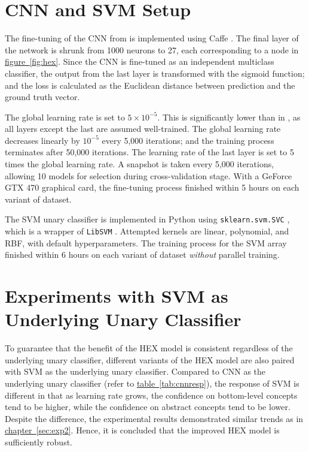\documentclass[11pt,a4paper]{book}
\begin{document}
\section{CNN and SVM Setup}
\label{sec:setup}

The fine-tuning of the CNN from \cite{krizhevsky2012imagenet} is implemented using Caffe \cite{jia2014caffe}. The final layer of the network is shrunk from 1000 neurons to 27, each corresponding to a node in \hyperref[fig:hex]{figure~\ref{fig:hex}}. Since the CNN is fine-tuned as an independent multiclass classifier, the output from the last layer is transformed with the sigmoid function; and the loss is calculated as the Euclidean distance between prediction and the ground truth vector.

The global learning rate is set to $5\times10^{-5}$. This is significantly lower than in \cite{krizhevsky2012imagenet}, as all layers except the last are assumed well-trained. The global learning rate decreases linearly by $10^{-5}$ every 5,000 iterations; and the training process terminates after 50,000 iterations. The learning rate of the last layer is set to 5 times the global learning rate. A snapshot is taken every 5,000 iterations, allowing 10 models for selection during cross-validation stage. With a GeForce GTX 470 graphical card, the fine-tuning process finished within 5 hours on each variant of dataset.

The SVM unary classifier is implemented in Python using \texttt{sklearn.svm.SVC} \cite{sklearn}, which is a wrapper of \texttt{LibSVM} \cite{libsvm}. Attempted kernels are linear, polynomial, and RBF, with default hyperparameters. The training process for the SVM array finished within 6 hours on each variant of dataset \emph{without} parallel training.

\section{Experiments with SVM as Underlying Unary Classifier}
\label{sec:svm}

To guarantee that the benefit of the HEX model is consistent regardless of the underlying unary classifier, different variants of the HEX model are also paired with SVM as the underlying unary classifier. Compared to CNN as the underlying unary classifier (refer to \hyperref[tab:cnnresp]{table~\ref{tab:cnnresp}}), the response of SVM is different in that as learning rate grows, the confidence on bottom-level concepts tend to be higher, while the confidence on abstract concepts tend to be lower. Despite the difference, the experimental results demonstrated similar trends as in \hyperref[sec:exp2]{chapter~\ref{sec:exp2}}. Hence, it is concluded that the improved HEX model is sufficiently robust.
\end{document}
